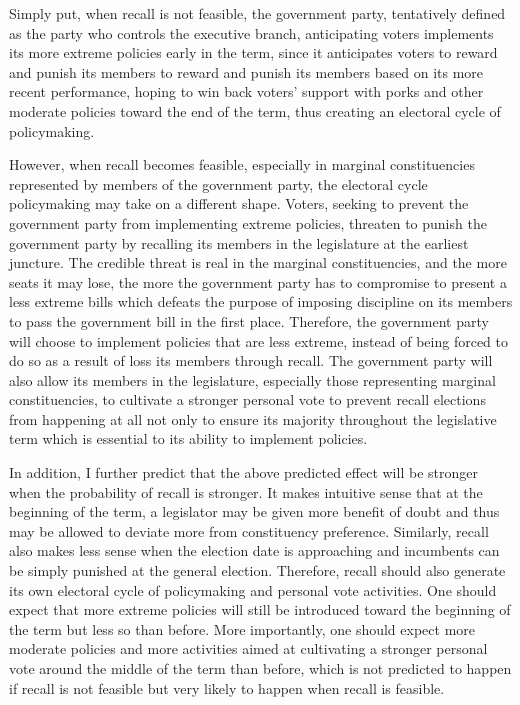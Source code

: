 \documentclass[hyphens, crop=false]{standalone}
\begin{document}
	Simply put,
	when recall is not feasible,
	the government party,
	tentatively defined as the party who controls the executive branch,
	anticipating voters 
	implements its more extreme policies early in the term,
	since it anticipates voters to reward and punish its members
	to reward and punish its members
	based on its more recent performance,
	hoping to win back voters' support with porks and other moderate policies
	toward the end of the term,
	thus creating an electoral cycle of policymaking.
	
	However,
	when recall becomes feasible,
	especially in marginal constituencies represented by members of the government party,
	the electoral cycle policymaking may take on a different shape.
	Voters, seeking to prevent the government party
	from implementing extreme policies,
	threaten to punish the government party
	by recalling its members in the legislature
	at the earliest juncture.
	The credible threat is real in the marginal constituencies,
	and the more seats it may lose,
	the more the government party has to compromise
	to present a less extreme bills
	which defeats the purpose of imposing
	discipline on its members to pass the government bill in the first place.
	Therefore, the government party
	will choose to implement policies that are less extreme,
	instead of being forced to do so as a result of loss its members
	through recall.
	The government party will also allow its members in the legislature,
	especially those representing marginal constituencies,
	to cultivate a stronger personal vote
	to prevent recall elections from happening at all
	not only to ensure its majority throughout the legislative term
	which is essential to its ability to implement policies.
	
	
	In addition,
	I further predict that the above predicted effect
	will be stronger when the probability of recall is stronger.
	It makes intuitive sense that at the beginning of the term,
	a legislator may be given more benefit of doubt
	and thus may be allowed to deviate more from constituency preference.
	Similarly, recall also makes less sense when the election date
	is approaching and incumbents can be simply punished at the general election.
	Therefore, recall should also generate its own
	electoral cycle of policymaking and personal vote activities.
	One should expect that more extreme policies will still be introduced toward the beginning of the term
	but less so than before.
	More importantly, one should expect more moderate policies
	and more activities aimed at cultivating a stronger personal vote
	around the middle of the term than before,
	which is not predicted to happen if recall is not feasible
	but very likely to happen when recall is feasible.
	
\end{document}
